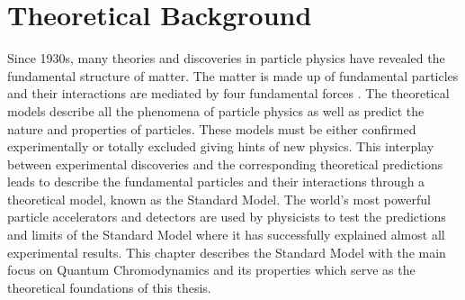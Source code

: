 \chapter{Theoretical Background}
\label{chap:Theory}
Since 1930s, many theories and discoveries in particle physics have revealed the fundamental structure of matter. The matter is made up of fundamental particles and their interactions are mediated by four fundamental forces \cite{Griffiths:111880}. The theoretical models describe all the phenomena of particle physics as well as predict the nature and properties of particles. These models must be either confirmed experimentally or totally excluded giving hints of new physics. This interplay between experimental discoveries and the corresponding theoretical predictions leads to describe the fundamental particles and their interactions through a theoretical model, known as the Standard Model. The world's most powerful particle accelerators and detectors are used by physicists to test the predictions and limits of the Standard Model where it has successfully explained almost all experimental results. This chapter describes the Standard Model with the main focus on Quantum Chromodynamics and its properties which serve as the theoretical foundations of this thesis.

